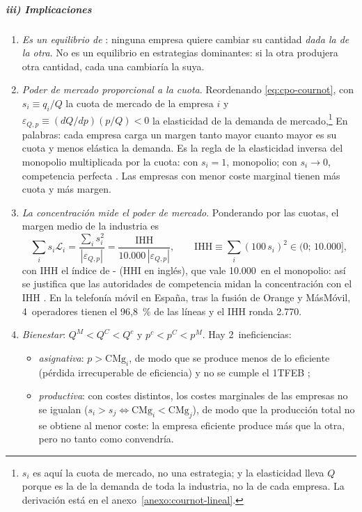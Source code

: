 \documentclass[11pt]{article}
\begin{document}
\subparagraph{iii) Implicaciones}

\begin{enumerate}
\item \emph{Es un equilibrio de }: ninguna empresa quiere cambiar su cantidad \emph{dada la de la otra}. No es un equilibrio en estrategias dominantes: si la otra produjera otra cantidad, cada una cambiaría la suya.
\item \emph{Poder de mercado proporcional a la cuota}. Reordenando \eqref{eq:cpo-cournot}, con $s_i\equiv q_i/Q$ la cuota de mercado de la empresa $i$ y $\varepsilon_{Q,p}\equiv(dQ/dp)(p/Q)<0$ la elasticidad de la demanda de mercado,\footnote{$s_i$ es aquí la cuota de mercado, no una estrategia; y la elasticidad lleva $Q$ porque es la de la demanda de toda la industria, no la de cada empresa. La derivación está en el anexo~\ref{anexo:cournot-lineal}.}
  En palabras: cada empresa carga un margen tanto mayor cuanto mayor es su cuota y menos elástica la demanda. Es la regla de la elasticidad inversa del monopolio  multiplicada por la cuota: con $s_i=1$, monopolio; con $s_i\to0$, competencia perfecta . Las empresas con menor coste marginal tienen más cuota y más margen.
\item \emph{La concentración mide el poder de mercado}. Ponderando por las cuotas, el margen medio de la industria es
  \[
  \sum_is_i\mathcal{L}_i=\frac{\sum_is_i^2}{|\varepsilon_{Q,p}|}=\frac{\mathrm{IHH}}{10.000\,|\varepsilon_{Q,p}|},\qquad \mathrm{IHH}\equiv\sum_i(100\,s_i)^2\in(0;\,10.000],
  \]
  con IHH el índice de - (HHI en inglés), que vale 10.000~en el monopolio\nocite{CowlingWaterson1976Price}: así se justifica que las autoridades de competencia midan la concentración con el IHH . En la telefonía móvil en España, tras la fusión de Orange y MásMóvil, 4~operadores tienen el 96,8~\% de las líneas y el IHH ronda 2.770\nocite{CNMC2026Telecos2T}.
\item \emph{Bienestar}: $Q^M<Q^C<Q^c$ y $p^c<p^C<p^M$. Hay 2~ineficiencias:
  \begin{itemize}
  \item \emph{asignativa}: $p>\mathrm{CMg}_i$, de modo que se produce menos de lo eficiente (pérdida irrecuperable de eficiencia) y no se cumple el 1TFEB ;
  \item \emph{productiva}: con costes distintos, los costes marginales de las empresas no se igualan ($s_i>s_j\Leftrightarrow\mathrm{CMg}_i<\mathrm{CMg}_j$), de modo que la producción total no se obtiene al menor coste: la empresa eficiente produce más que la otra, pero no tanto como convendría.

\end{itemize}
\end{enumerate}
\end{document}
